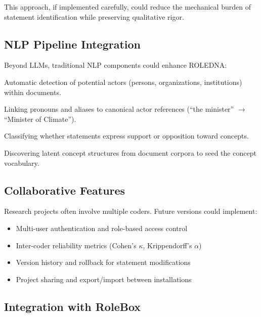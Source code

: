 \documentclass[../main.tex]{subfiles}
\begin{document}
This approach, if implemented carefully, could reduce the mechanical burden of statement identification while preserving qualitative rigor.

\subsection{NLP Pipeline Integration}

Beyond LLMs, traditional NLP components could enhance ROLEDNA:

\begin{description}[leftmargin=0.5cm, itemsep=0.3em]
\item[Named Entity Recognition] Automatic detection of potential actors (persons, organizations, institutions) within documents.

\item[Coreference Resolution] Linking pronouns and aliases to canonical actor references (``the minister'' $\rightarrow$ ``Minister of Climate'').

\item[Stance Detection] Classifying whether statements express support or opposition toward concepts.

\item[Topic Modeling] Discovering latent concept structures from document corpora to seed the concept vocabulary.
\end{description}

\subsection{Collaborative Features}

Research projects often involve multiple coders. Future versions could implement:

\begin{itemize}
\item Multi-user authentication and role-based access control
\item Inter-coder reliability metrics (Cohen's $\kappa$, Krippendorff's $\alpha$)
\item Version history and rollback for statement modifications
\item Project sharing and export/import between installations
\end{itemize}

\subsection{Integration with RoleBox}
\end{document}
